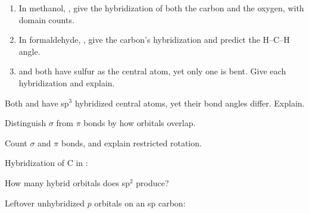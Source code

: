 \documentclass{apchem-notes}
\begin{document}
\begin{enumerate}[leftmargin=*,itemsep=0.4em]
  \item In methanol, , give the hybridization of both the carbon
        and the oxygen, with domain counts.
  \item In formaldehyde, , give the carbon's hybridization and
        predict the H--C--H angle. 
  \item {} and  both have sulfur as the central atom, yet only
        one is bent. Give each hybridization and explain.
\end{enumerate}

\begin{exitticket}
Both  and  have sp$^3$ hybridized central atoms, yet their
bond angles differ. Explain. 
\end{exitticket}


\begin{objectives}
  \item Distinguish $\sigma$ from $\pi$ bonds by how orbitals overlap.
  \item Count $\sigma$ and $\pi$ bonds, and explain restricted rotation.
\end{objectives}


\begin{warmup}[3]
  \item Hybridization of C in : 
  \item How many hybrid orbitals does sp$^2$ produce?
  \item Leftover unhybridized $p$ orbitals on an sp carbon:
\end{warmup}
\end{document}
